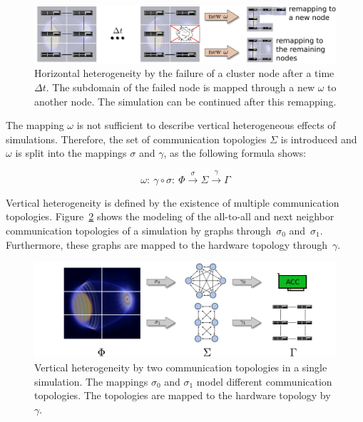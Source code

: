 \begin{figure}[H]
  \centering \includegraphics[width=\textwidth]{graphics/30_resilience}
  \caption{Horizontal heterogeneity by the failure of a cluster node after
    a time $\Delta t$. The subdomain of the failed node is mapped
    through a new $\omega$ to another node. The simulation can be
    continued after this remapping.}
  \label{fig:resilience}
\end{figure}

\noindent The mapping $\omega$ is not sufficient to describe vertical
heterogeneous effects of simulations. Therefore, the set of
communication topologies $\Sigma$ is introduced and $\omega$ is split
into the mappings $\sigma$ and $\gamma$, as the following formula
shows:

\[\omega:~\gamma \circ \sigma:~\Phi \xrightarrow{\sigma} \Sigma \xrightarrow{\gamma} \Gamma\]

\noindent Vertical heterogeneity is defined by the existence of
multiple communication topologies.  Figure~\ref{fig:vertical_hetero}
shows the modeling of the all-to-all and next neighbor communication
topologies of a simulation by graphs through~$\sigma_0$
and~$\sigma_1$.  Furthermore, these graphs are mapped to the hardware
topology through~$\gamma$.


\begin{figure}[H]
  \centering \includegraphics[width=\textwidth]{graphics/30_vertical_hetero}
  \caption{Vertical heterogeneity by two communication topologies in a
    single simulation. The mappings $\sigma_0$ and $\sigma_1$ model different
    communication topologies. The topologies are mapped to the hardware
  topology by $\gamma$.}
  \label{fig:vertical_hetero}
\end{figure}


